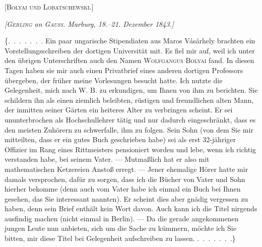 \clearpage
{}%
\begin{center}
{\Large\textsc{[Bolyai und Lobatschewski.]}}



\emph{[\textup{\textsc{Gerling}} an \textup{\textsc{Gauss}}. Marburg, 18.--21. Dezember 1843.]}
\end{center}


\{\mbox{.\ .\ .\ .\ .\ .\ .} Ein paar ungarische Stipendiaten aus Maros Vásárhely brachten ein
Vorstellungsschreiben der dortigen Universität mit. Es fiel mir auf, weil ich unter
den übrigen Unterschriften auch den Namen \textsc{Wolfgangus Bolyai} fand. In
diesen Tagen haben sie mir auch einen Privatbrief eines anderen dortigen
Professors übergeben, der früher meine Vorlesungen besucht hatte. Ich nutzte die Gelegenheit,
mich nach W. B. zu erkundigen, um Ihnen von ihm zu berichten. Sie schildern ihn als einen
ziemlich beleibten, rüstigen und freundlichen alten Mann, der inmitten seiner
Gärten ein heiteres Alter zu verbringen scheint. Er sei ununterbrochen als Hochschullehrer
tätig und nur dadurch eingeschränkt, dass es den meisten Zuhörern zu
schwerfalle, ihm zu folgen. Sein Sohn (von dem Sie mir mitteilten, dass er ein
gutes Buch geschrieben habe) sei als erst 32-jähriger Offizier im Rang eines Rittmeisters pensioniert
worden und lebe, wenn ich richtig verstanden habe, bei seinem Vater. --- Mutmaßlich
hat er also mit mathematischen Ketzereien Anstoß erregt. --- Jener ehemalige
Hörer hatte mir damals versprochen, dafür zu sorgen, dass ich die Bücher von
Vater und Sohn hierher bekomme (denn auch vom Vater habe ich einmal ein Buch bei Ihnen gesehen, das
Sie interessant nannten). Er scheint dies aber gnädig vergessen zu haben,
denn sein Brief enthält kein Wort davon. Auch kann ich die Titel nirgends ausfindig machen
(nicht einmal in Berlin). --- Da die gerade angekommenen
jungen Leute nun anbieten, sich um die Sache zu kümmern, möchte ich Sie bitten,
mir diese Titel bei Gelegenheit aufschreiben zu lassen. \mbox{.\ .\ .\ .\ .\ .\ .}\}



